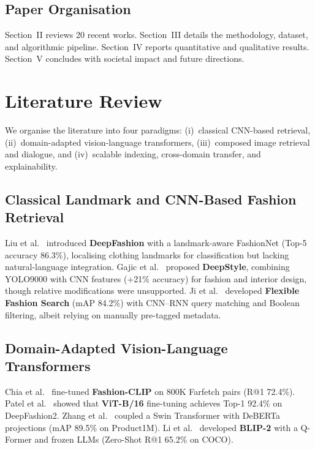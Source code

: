 \documentclass[conference]{IEEEtran}
\begin{document}
\subsection{Paper Organisation}
Section~II reviews 20 recent works. Section~III details the methodology, dataset, and algorithmic pipeline. Section~IV reports quantitative and qualitative results. Section~V concludes with societal impact and future directions.

\section{Literature Review}

We organise the literature into four paradigms: (i)~classical CNN-based retrieval, (ii)~domain-adapted vision-language transformers, (iii)~composed image retrieval and dialogue, and (iv)~scalable indexing, cross-domain transfer, and explainability.

\subsection{Classical Landmark and CNN-Based Fashion Retrieval}
Liu et al.~\cite{liu2016deepfashion} introduced \textbf{DeepFashion} with a landmark-aware FashionNet (Top-5 accuracy 86.3\%), localising clothing landmarks for classification but lacking natural-language integration. Gajic et al.~\cite{gajic2018deepstyle} proposed \textbf{DeepStyle}, combining YOLO9000 with CNN features (+21\% accuracy) for fashion and interior design, though relative modifications were unsupported. Ji et al.~\cite{ji2020flexible} developed \textbf{Flexible Fashion Search} (mAP 84.2\%) with CNN--RNN query matching and Boolean filtering, albeit relying on manually pre-tagged metadata.

\subsection{Domain-Adapted Vision-Language Transformers}
Chia et al.~\cite{chia2022fashionclip} fine-tuned \textbf{Fashion-CLIP} on 800K Farfetch pairs (R@1 72.4\%). Patel et al.~\cite{patel2023vitb16} showed that \textbf{ViT-B/16} fine-tuning achieves Top-1 92.4\% on DeepFashion2. Zhang et al.~\cite{zhang2023crossmodal} coupled a Swin Transformer with DeBERTa projections (mAP 89.5\% on Product1M). Li et al.~\cite{li2023blip2} developed \textbf{BLIP-2} with a Q-Former and frozen LLMs (Zero-Shot R@1 65.2\% on COCO).
\end{document}
